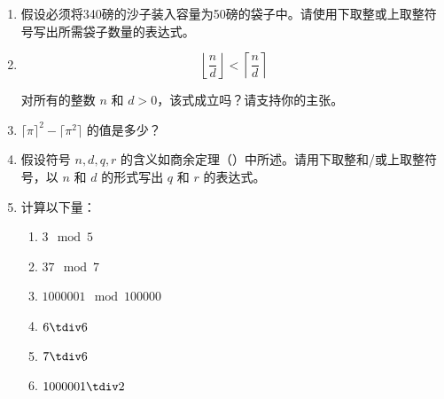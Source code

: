 \begin{enumerate}
    一个众所周知的事实是，如果一个数能被3整除，那么3也能整除该数（十进制）的各位数字之和。这个结论在7进制中成立吗？你认为这个结论在{\em 任何}进制中都成立吗？
  \wbvfill
   
  
  \item 
    假设必须将340磅的沙子装入容量为50磅的袋子中。请使用下取整或上取整符号写出所需袋子数量的表达式。
  \wbvfill
  
  
  \textbookpagebreak
  
  \item 
   \[ \left\lfloor \frac{n}{d}\right\rfloor < \left\lceil \frac{n}{d}\right\rceil \]
   
  
  对所有的整数 $n$ 和 $d>0$，该式成立吗？请支持你的主张。
  \wbvfill
  
  
  \workbookpagebreak
  
  \item 
  
  $\lceil\pi\rceil^{2}-\lceil\pi^{2}\rceil$ 的值是多少？
  \wbvfill
  
  
  
  
  \item 
    
    假设符号 $n,d,q,r$ 的含义如商余定理（）中所述。请用下取整和/或上取整符号，以 $n$ 和 $d$ 的形式写出 $q$ 和 $r$ 的表达式。
  \wbvfill
  
  
  \hintspagebreak
  
  \item 
  
  计算以下量：
  
  \begin{enumerate}
  \item \wbitemsep $3 \mod 5$
  \item \wbitemsep $37 \mod 7$
  \item \wbitemsep $1000001 \mod 100000$
  \item \wbitemsep $6 \tdiv 6$
  \item \wbitemsep $7 \tdiv 6$
  \item \wbitemsep $1000001 \tdiv 2$
  \end{enumerate}
  

\end{enumerate}
